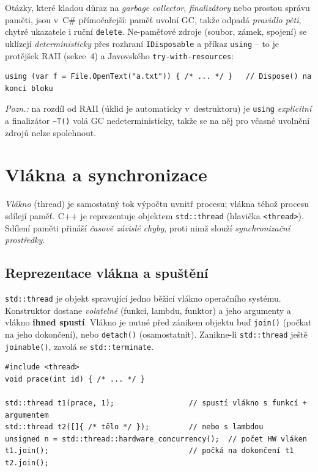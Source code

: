 \documentclass[11pt,a4paper]{article}
\newcommand{\cd}{\lstinline[style=cpp]}
\begin{document}
\begin{csalt}
Otázky, které kladou důraz na \emph{garbage collector}, \emph{finalizátory} nebo prostou správu paměti, jsou v~C\# přímočařejší: paměť uvolní GC, takže odpadá \emph{pravidlo pěti}, chytré ukazatele i ruční \cd{delete}. Ne-paměťové zdroje (soubor, zámek, spojení) se uklízejí \emph{deterministicky} přes rozhraní \cd{IDisposable} a příkaz \cd{using} -- to je protějšek RAII (sekce~4) a Javovského \texttt{try-with-resources}:
\begin{lstlisting}[style=cs]
using (var f = File.OpenText("a.txt")) { /* ... */ }   // Dispose() na konci bloku
\end{lstlisting}
\emph{Pozn.:} na rozdíl od RAII (úklid je automaticky v~destruktoru) je \cd{using} \emph{explicitní} a finalizátor \lstinline[style=cs]!~T()! volá GC nedeterministicky, takže se na něj pro včasné uvolnění zdrojů nelze spolehnout.
\end{csalt}

\section{Vlákna a synchronizace}

\emph{Vlákno} (thread) je samostatný tok výpočtu uvnitř procesu; vlákna téhož procesu sdílejí paměť. C++ je reprezentuje objektem \cd{std::thread} (hlavička \texttt{<thread>}). Sdílení paměti přináší \emph{časově závislé chyby}, proti nimž slouží \emph{synchronizační prostředky}.

\subsection{Reprezentace vlákna a spuštění}

\begin{definice}
\cd{std::thread} je objekt spravující jedno běžící vlákno operačního systému. Konstruktor dostane \emph{volatelné} (funkci, lambdu, funktor) a jeho argumenty a vlákno \textbf{ihned spustí}. Vlákno je nutné před zánikem objektu buď \cd{join()} (počkat na jeho dokončení), nebo \cd{detach()} (osamostatnit). Zanikne-li \cd{std::thread} ještě \cd{joinable()}, zavolá se \cd{std::terminate}.
\end{definice}

\begin{lstlisting}[style=cpp]
#include <thread>
void prace(int id) { /* ... */ }

std::thread t1(prace, 1);                 // spustí vlákno s funkcí + argumentem
std::thread t2([]{ /* tělo */ });         // nebo s lambdou
unsigned n = std::thread::hardware_concurrency();  // počet HW vláken
t1.join();                                // počká na dokončení t1
t2.join();
\end{lstlisting}
\end{document}
